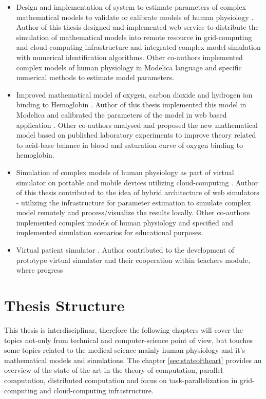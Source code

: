\begin{itemize}
\item Design and implementation of system to estimate parameters of complex mathematical models to validate or calibrate models of human physiology \cite{Kulhanek2011, Kulhanek2014Parameters, Kulhanek2010, Kulhanek2013c, Kulhanek2014}. Author of this thesis designed and implemented web service to distribute the simulation of mathematical models into remote resource in grid-computing and cloud-computing infrastructure and integrated complex model simulation with numerical identification algorithms. Other co-authors implemented complex models of human physiology in Modelica language and specific numerical methods to estimate model parameters.
\item Improved mathematical model of oxygen, carbon dioxide and hydrogen ion binding to Hemoglobin \cite{Matejak2014sj}. Author of this thesis implemented this model in Modelica and calibrated the parameters of the model in web based application \cite{Kulhanek2014Parameters}. Other co-authors analysed and proposed the new mathematical model based on published laboratory experiments to improve theory related to acid-base balance in blood and saturation curve of oxygen binding to hemoglobin.
\item Simulation of complex models of human physiology as part of virtual simulator on portable and mobile devices utilizing cloud-computing \cite{Kulhanek2013c,Kulhanek2013b}. Author of this thesis contributed to the idea of hybrid architecture of web simulators - utilizing the infrastructure for parameter estimation to simulate complex model remotely and process/visualize the results locally. Other co-authors implemented complex models of human physiology and specified and implemented simulation scenarios for educational purposes.
\item Virtual patient simulator \cite{Kofranek2014a}. Author contributed to the development of prototype virtual simulator and their cooperation within teachers module, where progress
\end{itemize}

\section{Thesis Structure}
This thesis is interdisciplinar, therefore the following chapters will cover the topics not-only from technical and computer-science point of view, but touches some topics related to the medical science mainly human physiology and it's mathematical models and simulations.
The chapter \ref{sec:stateoftheart} provides an overview of the state of the art in the theory of computation, parallel computation, distributed computation and focus on task-parallelization in grid-computing and cloud-computing infrastructure. 

